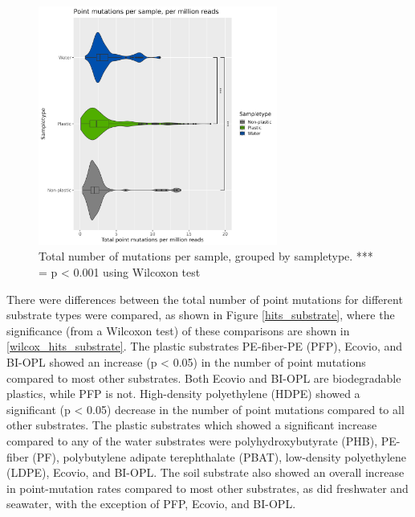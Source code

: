 \begin{figure}[h!]
    \centering
    \includegraphics[width = 0.7\textwidth]{figure/hits_per_million_type.png}
    \caption{Total number of mutations per sample, grouped by sampletype. *** = p < 0.001 using Wilcoxon test}
    \label{hits_type}
\end{figure}

There were differences between the total number of point mutations for different substrate types were compared, as shown in Figure \ref{hits_substrate}, where the significance (from a Wilcoxon test) of these comparisons are shown in \ref{wilcox_hits_substrate}.
The plastic substrates PE-fiber-PE (PFP), Ecovio, and BI-OPL showed an increase (p < 0.05) in the number of point mutations compared to most other substrates. Both Ecovio and BI-OPL are biodegradable plastics, while PFP is not.
High-density polyethylene (HDPE) showed a significant (p < 0.05) decrease in the number of point mutations compared to all other substrates.
The plastic substrates which showed a significant increase compared to any of the water substrates were polyhydroxybutyrate (PHB), PE-fiber (PF), polybutylene adipate terephthalate (PBAT), low-density polyethylene (LDPE), Ecovio, and BI-OPL.
The soil substrate also showed an overall increase in point-mutation rates compared to most other substrates, as did freshwater and seawater, with the exception of PFP, Ecovio, and BI-OPL. 

